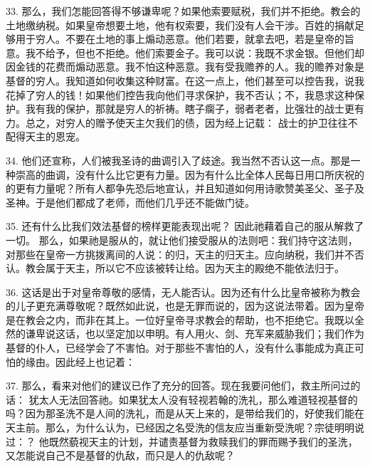 33. 那么，我们怎能回答得不够谦卑呢？如果他索要赋税，我们并不拒绝。教会的土地缴纳税。如果皇帝想要土地，他有权索要，我们没有人会干涉。百姓的捐献足够用于穷人。不要在土地的事上煽动恶意。他们若要，就拿去吧，若是皇帝的旨意。我不给予，但也不拒绝。他们索要金子。我可以说：我既不求金银。但他们却因金钱的花费而煽动恶意。我不怕这种恶意。我有受我赡养的人。我的赡养对象是基督的穷人。我知道如何收集这种财富。在这一点上，他们甚至可以控告我，说我花掉了穷人的钱！如果他们控告我向他们寻求保护，我不否认；不，我恳求这种保护。我有我的保护，那就是穷人的祈祷。瞎子瘸子，弱者老者，比强壮的战士更有力。总之，对穷人的赠予使天主欠我们的债，因为经上记载：  战士的护卫往往不配得天主的恩宠。\par

34. 他们还宣称，人们被我圣诗的曲调引入了歧途。我当然不否认这一点。那是一种崇高的曲调，没有什么比它更有力量。因为有什么比全体人民每日用口所庆祝的的更有力量呢？所有人都争先恐后地宣认，并且知道如何用诗歌赞美圣父、圣子及圣神。于是他们都成了老师，而他们几乎还不能做门徒。\par

35. 还有什么比我们效法基督的榜样更能表现出呢？ 因此祂藉着自己的服从解救了一切。 那么，如果祂是服从的，就让他们接受服从的法则吧：我们持守这法则，对那些在皇帝一方挑拨离间的人说：的归，天主的归天主。应向纳税，我们并不否认。教会属于天主，所以它不应该被转让给。因为天主的殿绝不能依法归于。\par

36. 这话是出于对皇帝尊敬的感情，无人能否认。因为还有什么比皇帝被称为教会的儿子更充满尊敬呢？既然如此说，也是无罪而说的，因为这说法带着。因为皇帝是在教会之内，而非在其上。一位好皇帝寻求教会的帮助，也不拒绝它。我既以全然的谦卑说这话，也以坚定加以申明。有人用火、剑、充军来威胁我们；我们作为基督的仆人，已经学会了不害怕。对于那些不害怕的人，没有什么事能成为真正可怕的缘由。因此经上也记着：\par

37. 那么，看来对他们的建议已作了充分的回答。现在我要问他们，救主所问过的话： 犹太人无法回答祂。如果犹太人没有轻视若翰的洗礼，那么难道轻视基督的吗？因为那圣洗不是人间的洗礼，而是从天上来的，是带给我们的，好使我们能在天主前。那么，为什么认为，已经因之名受洗的信友应当重新受洗呢？宗徒明明说过：？ 他既然藐视天主的计划，并谴责基督为救赎我们的罪而赐予我们的圣洗，又怎能说自己不是基督的仇敌，而只是人的仇敌呢？\par

